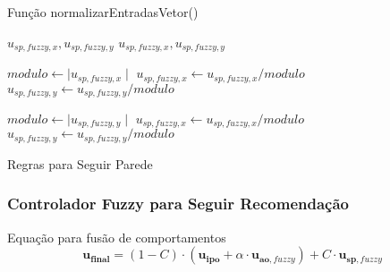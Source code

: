 \begin{frame}
	\begin{block}{Função normalizarEntradasVetor()}
		\begin{algorithm}[H]
			\scriptsize
			\caption{Normalização de Componentes do vetor}
			\begin{algorithmic}[1]
		
			\REQUIRE $u_{sp,\mathit{fuzzy}, x}, u_{sp,\mathit{fuzzy}, y}$
			\ENSURE $u_{sp,\mathit{fuzzy}, x}, u_{sp,\mathit{fuzzy}, y}$
			
			\STATE $modulo \leftarrow \mid u_{sp,\mathit{fuzzy}, x} \mid$
				\STATE $u_{sp,\mathit{fuzzy}, x} \leftarrow u_{sp,\mathit{fuzzy}, x}/modulo$
				\STATE $u_{sp,\mathit{fuzzy}, y} \leftarrow u_{sp,\mathit{fuzzy}, y}/modulo$
			\ENDIF
			
			\STATE $modulo \leftarrow \mid u_{sp,\mathit{fuzzy}, y} \mid$
				\STATE $u_{sp,\mathit{fuzzy}, x} \leftarrow u_{sp,\mathit{fuzzy}, x}/modulo$
				\STATE $u_{sp,\mathit{fuzzy}, y} \leftarrow u_{sp,\mathit{fuzzy}, y}/modulo$
			\ENDIF
		
			\end{algorithmic}
		\end{algorithm}
	\end{block}
\end{frame}

\begin{frame}
	\begin{block}{Regras para Seguir Parede}
		
	\end{block}
\end{frame}

\begin{frame}
	\frametitle{Controlador Fuzzy para Seguir Recomendação}
	\begin{exampleblock}{Equação para fusão de comportamentos}
		\begin{equation}
			\mathbf{u_{final}} = 
			(1 - C) \cdot (\mathbf{u_{ipo}} + \alpha \cdot \mathbf{u_{ao, \mathit{fuzzy}}})
			+ C \cdot \mathbf{u_{sp, \mathit{fuzzy}}}
		\end{equation}
	\end{exampleblock}
\end{frame}
	
\begin{frame}
	
\end{frame}


